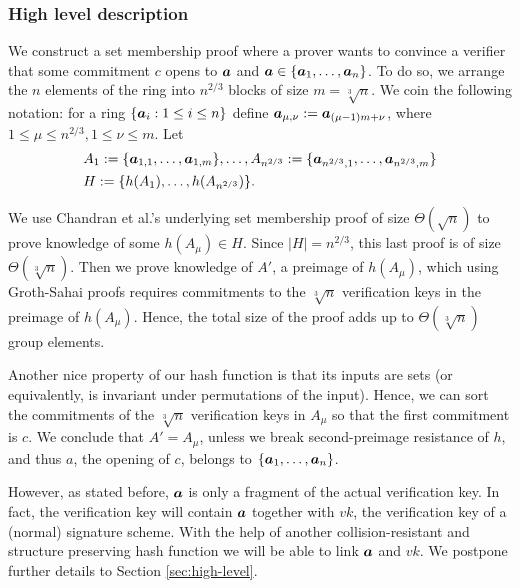 \subsubsection{High level description}
We construct a set membership proof where a prover wants to convince a verifier that some commitment $c$ opens to ${\boldsymbol{a}}$ and ${\boldsymbol{a}}\in\{{\boldsymbol{a}}_1,\ldots,{\boldsymbol{a}}_n\}$. To do so, we arrange the $n$ elements of the ring into $n^{2/3}$ blocks of size $m=\sqrt[3]{n}$. We coin the following notation: for a ring $\{{\boldsymbol{a}}_i:1\leq i \leq n\}$ define ${\boldsymbol{a}}_{\mu,\nu}:={\boldsymbol{a}}_{(\mu-1)m+\nu}$, where  $1\leq\mu\leq n^{2/3},1\leq \nu\leq m$.  Let
\begin{align*}
& A_1 := \{{\boldsymbol{a}}_{1,1},\ldots,{\boldsymbol{a}}_{1,m}\},\ldots, A_{n^{2/3}} := \{{\boldsymbol{a}}_{n^{2/3},1},\ldots,{\boldsymbol{a}}_{n^{2/3},m}\}\\
&H:=\{h(A_1),\ldots,\allowbreak h(A_{n^{2/3}})\}.
\end{align*}

We use Chandran et al.'s underlying set membership proof of size $\Theta(\sqrt{n})$ to prove knowledge of some $h(A_\mu)\in H$. Since $|H|=n^{2/3}$, this last proof is of size $\Theta(\sqrt[3]{n})$. Then we prove knowledge of $A'$, a preimage of $h(A_\mu)$, which using Groth-Sahai proofs requires commitments to the $\sqrt[3]{n}$ verification keys in the preimage of $h(A_\mu)$. Hence, the total size of the proof adds up to $\Theta(\sqrt[3]{n})$ group elements.

Another nice property of our hash function is that its inputs are sets (or equivalently, is invariant under permutations of the input). Hence, we can sort the commitments of the $\sqrt[3]{n}$ verification keys in $A_\mu$ so that the first commitment is $c$. We conclude that $A'=A_\mu$, unless we break second-preimage resistance of $h$, and thus $a$, the opening of $c$, belongs to $\{{\boldsymbol{a}}_1,\ldots,{\boldsymbol{a}}_n\}$.

However, as stated before, ${\boldsymbol{a}}$ is only a fragment of the actual verification key. In fact, the verification key will contain ${\boldsymbol{a}}$ together with $vk$, the verification key of a (normal) signature scheme. With the help of another collision-resistant and structure preserving hash function we will be able to link ${\boldsymbol{a}}$ and $vk$. We postpone further details to Section \ref{sec:high-level}.